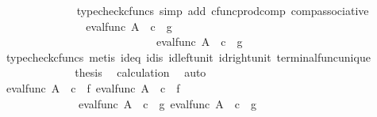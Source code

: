 \begin{isabellebody}
\ \ \ \ \ \ \ \ \ \ \ \ \isamarkupfalse%
\ {\isacharparenleft}{\kern0pt}typecheck{\isacharunderscore}{\kern0pt}cfuncs{\isacharcomma}{\kern0pt}\ simp\ add{\isacharcolon}{\kern0pt}\ cfunc{\isacharunderscore}{\kern0pt}prod{\isacharunderscore}{\kern0pt}comp\ comp{\isacharunderscore}{\kern0pt}associative{}{\isacharparenright}{\kern0pt}\isanewline
\ \ \ \ \ \ \ \ \ \ \isamarkupfalse%
\ \isamarkupfalse%
\ {\isachardoublequoteopen}{\isachardot}{\kern0pt}{\isachardot}{\kern0pt}{\isachardot}{\kern0pt}\ {\isacharequal}{\kern0pt}\ {\isasymlangle}eval{\isacharunderscore}{\kern0pt}func\ A\ {\isasymOmega}\ {\isasymcirc}\isactrlsub c\ {\isasymlangle}{\isasymt}{\isacharcomma}{\kern0pt}\ g{\isasymrangle}{\isacharcomma}{\kern0pt}\isanewline
\ \ \ \ \ \ \ \ \ \ \ \ \ \ \ \ \ \ \ \ \ \ \ \ \ \ \ \ eval{\isacharunderscore}{\kern0pt}func\ A\ {\isasymOmega}\ {\isasymcirc}\isactrlsub c\ {\isasymlangle}{\isasymf}{\isacharcomma}{\kern0pt}\ g{\isasymrangle}{\isasymrangle}{\isachardoublequoteclose}\ \ \ \ \isanewline
\ \ \ \ \ \ \ \ \ \ \ \ \isamarkupfalse%
\ {\isacharparenleft}{\kern0pt}typecheck{\isacharunderscore}{\kern0pt}cfuncs{\isacharcomma}{\kern0pt}\ metis\ id{}{\isacharunderscore}{\kern0pt}eq\ id{}{\isacharunderscore}{\kern0pt}is\ id{\isacharunderscore}{\kern0pt}left{\isacharunderscore}{\kern0pt}unit{}\ id{\isacharunderscore}{\kern0pt}right{\isacharunderscore}{\kern0pt}unit{}\ terminal{\isacharunderscore}{\kern0pt}func{\isacharunderscore}{\kern0pt}unique{\isacharparenright}{\kern0pt}\isanewline
\ \ \ \ \ \ \ \ \ \ \isamarkupfalse%
\ \isamarkupfalse%
\ {\isacharquery}{\kern0pt}thesis\ \isamarkupfalse%
\ calculation\ \isamarkupfalse%
\ auto\isanewline
\ \ \ \ \ \ \ \ \isamarkupfalse%
\isanewline
\ \ \ \ \ \ \ \ \isamarkupfalse%
\ {\isachardoublequoteopen}{\isasymlangle}eval{\isacharunderscore}{\kern0pt}func\ A\ {\isasymOmega}\ {\isasymcirc}\isactrlsub c\ {\isasymlangle}{\isasymt}{\isacharcomma}{\kern0pt}\ f{\isasymrangle}{\isacharcomma}{\kern0pt}\ eval{\isacharunderscore}{\kern0pt}func\ A\ {\isasymOmega}\ {\isasymcirc}\isactrlsub c\ {\isasymlangle}{\isasymf}{\isacharcomma}{\kern0pt}\ f{\isasymrangle}{\isasymrangle}\ {\isacharequal}{\kern0pt}\ \isanewline
\ \ \ \ \ \ \ \ \ \ \ \ \ \ {\isasymlangle}eval{\isacharunderscore}{\kern0pt}func\ A\ {\isasymOmega}\ {\isasymcirc}\isactrlsub c\ {\isasymlangle}{\isasymt}{\isacharcomma}{\kern0pt}\ g{\isasymrangle}{\isacharcomma}{\kern0pt}\ eval{\isacharunderscore}{\kern0pt}func\ A\ {\isasymOmega}\ {\isasymcirc}\isactrlsub c\ {\isasymlangle}{\isasymf}{\isacharcomma}{\kern0pt}\ g{\isasymrangle}{\isasymrangle}{\isachardoublequoteclose}\isanewline

\end{isabellebody}
